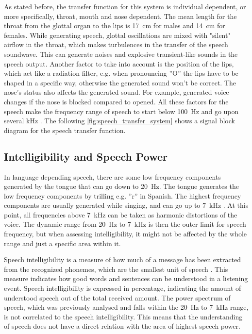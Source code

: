 As stated before, the transfer function for this system is individual dependent, or more specifically, throat, mouth and nose dependent. The mean length for the throat from the glottal organ to the lips is \SI{17}{\centi\meter} for males and \SI{14}{\centi\meter} for females. While generating speech, glottal oscillations are mixed with "silent" airflow in the throat, which makes turbulences in the transfer of the speech soundwave. This can generate noises and explosive transient-like sounds in the speech output. Another factor to take into account is the position of the lips, which act like a radiation filter, e.g. when pronouncing ''O'' the lips have to be shaped in a specific way, otherwise the generated sound won't be correct. The nose's status also affects the generated sound. For example, generated voice changes if the nose is blocked compared to opened. All these factors for the speech make the frequency range of speech to start below \SI{100}{\hertz} and go upon several \si{\kilo\hertz} \citep{pulkki2015}. The following \autoref{fig:speech_transfer_system} shows a signal block diagram for the speech transfer function.


\subsection{Intelligibility and Speech Power}
\label{sec:intel}

In language depending speech, there are some low frequency components generated by the tongue that can go down to \SI{20}{\hertz}. The tongue generates the low frequency components by trilling e.g. ''r'' in Spanish. The highest frequency components are usually generated while singing, and can go up to \SI{7}{\kilo\hertz} \citep{pulkki2015}. At this point, all frequencies above \SI{7}{\kilo\hertz} can be taken as harmonic distortions of the voice. The dynamic range from \SI{20}{\hertz} to \SI{7}{\kilo\hertz} is then the outer limit for speech frequency, but when assessing intelligibility, it might not be affected by the whole range and just a specific area within it.

Speech intelligibility is a measure of how much of a message has been extracted from the recognized phonemes, which are the smallest unit of speech \citep{arl_us_army}. This measure indicates how good words and sentences can be understood in a listening event. Speech intelligibility  is expressed in percentage, indicating the amount of understood speech out of the total received amount. The power spectrum of speech, which was previously analysed and falls within the \SI{20}{\hertz} to \SI{7}{\kilo\hertz} range, is not correlated to the speech intelligibility. This means that the understanding of speech does not have a direct relation with the area of highest speech power. 

